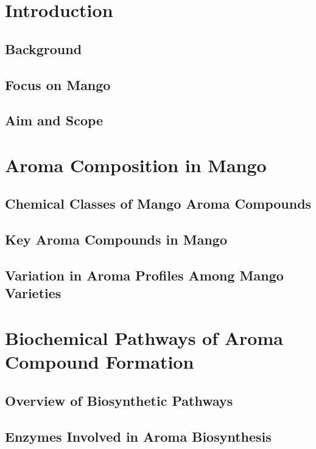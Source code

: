 \setcounter{chapter}{1}
\setcounter{section}{0}
\setlength{\headheight}{12.71342pt}
\addtolength{\topmargin}{-0.71342pt}

\section{Introduction}
\subsection{Background}
\subsection{Focus on Mango}
\subsection{Aim and Scope}


\section{Aroma Composition in Mango}
\subsection{Chemical Classes of Mango Aroma Compounds}
\subsection{Key Aroma Compounds in Mango}
\subsection{Variation in Aroma Profiles Among Mango Varieties}


\section{Biochemical Pathways of Aroma Compound Formation}
\subsection{Overview of Biosynthetic Pathways}
\subsection{Enzymes Involved in Aroma Biosynthesis}
